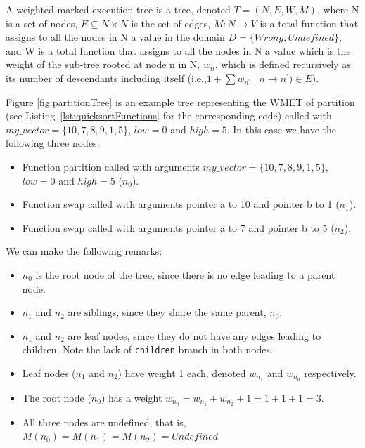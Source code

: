 \begin{definition}
A weighted marked execution tree is a tree, denoted \(T=(N,E,W,M)\), where N is a set of nodes, \(E\subseteq N \times N\) is the set of edges, \(M:N\to V\) is a total function that assigns to all the nodes in N a value in the domain \(D=\{\mathit{Wrong},\mathit{Undefined}\}\), and W is a total function that assigns to all the nodes in N a value which is the weight of the sub-tree rooted at node n in N, \(w_n\), which is defined recursively as its number of descendants including itself (i.e.,\(1 + \sum {w_{n^\prime}\mid n \to n^{\prime}) \in E}\)).
\theoremstyle{definition}
\begin{exmp}
Figure \ref{fig:partitionTree} is an example tree representing the  WMET of partition (see Listing~\ref{lst:quicksortFunctions} for the corresponding code) called with \(my\_vector = \{10, 7, 8, 9, 1, 5\}\), \(low = 0\) and \(high = 5\). In this case we have the following three nodes:
\begin{itemize}
    \item Function partition called with arguments \(my\_vector = \{10, 7, 8, 9, 1, 5\}\), \(low = 0\) and \(high = 5\) (\(n_0\)).
    \item Function swap called with arguments pointer a to 10 and pointer b to 1 (\(n_1\)).
    \item Function swap called with arguments pointer a to 7 and pointer b to 5 (\(n_2\)).
\end{itemize}
We can make the following remarks:
\begin{itemize}
    \item \(n_0\) is the root node of the tree, since there is no edge leading to a parent node.
    \item \(n_1\) and \(n_2\) are siblings, since they share the same parent, \(n_0\).
    \item \(n_1\) and \(n_2\) are leaf nodes, since they do not have any edges leading to children. Note the lack of \verb|children| branch in both nodes.
    \item Leaf nodes (\(n_1\) and \(n_2\)) have weight 1 each, denoted \(w_{n_1}\) and \(w_{n_0}\) respectively.
    \item The root node (\(n_0\)) has a weight \(w_{n_0} = w_{n_1} + w_{n_2} + 1 = 1 + 1 + 1 = 3\).  
    \item All three nodes are undefined, that is, \(M(n_0) = M(n_1) = M(n_2) = \mathit{Undefined}\)
\end{itemize}

\begin{figure}[ht]

\begin{verbatim}

\end{verbatim}
\end{figure}
\end{exmp}
\end{definition}

